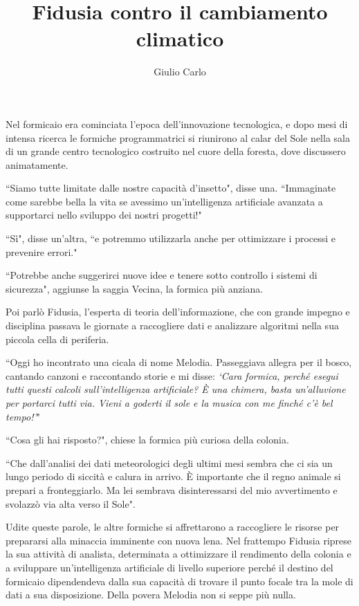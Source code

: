 \documentclass[12pt,b5paper]{article}
\author{Giulio Carlo}
\date{}
\title{Fidusia contro il cambiamento climatico}
\begin{document}
\maketitle
{}
Nel formicaio era cominciata l'epoca dell'innovazione tecnologica, e dopo mesi
di intensa ricerca le formiche programmatrici si riunirono al calar del Sole
nella sala di un grande centro tecnologico costruito nel cuore della foresta,
dove discussero animatamente.

``Siamo tutte limitate dalle nostre capacità d'insetto", disse una. ``Immaginate
come sarebbe bella la vita se avessimo un'intelligenza artificiale avanzata a
supportarci nello sviluppo dei nostri progetti!"

``Sì", disse un'altra, ``e potremmo utilizzarla anche per ottimizzare i processi
e prevenire errori."

``Potrebbe anche suggerirci nuove idee e tenere sotto controllo i sistemi di
sicurezza", aggiunse la saggia Vecina, la formica più anziana.

Poi parlò Fidusia, l'esperta di teoria dell'informazione, che con grande
impegno e disciplina passava le giornate a raccogliere dati e analizzare
algoritmi nella sua piccola cella di periferia.

``Oggi ho incontrato una cicala di nome Melodia. Passeggiava allegra
per il bosco, cantando canzoni e raccontando storie e mi disse:
\emph{`Cara formica, perché esegui tutti questi calcoli sull'intelligenza
artificiale? È una chimera, basta un'alluvione per portarci tutti via. Vieni
a goderti il sole e la musica con me finché c'è bel tempo!'}"

``Cosa gli hai risposto?", chiese la formica più curiosa della colonia.

``Che dall'analisi dei dati meteorologici degli ultimi mesi sembra che ci sia
un lungo periodo di siccità e calura in arrivo. È importante che il regno
animale si prepari a fronteggiarlo. Ma lei sembrava disinteressarsi del mio
avvertimento e svolazzò via alta verso il Sole".

Udite queste parole, le altre formiche si affrettarono a raccogliere le risorse
per prepararsi alla minaccia imminente con nuova lena. Nel frattempo Fidusia
riprese la sua attività di analista, determinata a ottimizzare il rendimento
della colonia e a sviluppare un'intelligenza artificiale di livello superiore
perché il destino del formicaio dipendendeva dalla sua capacità di trovare il
punto focale tra la mole di dati a sua disposizione. Della povera Melodia non
si seppe più nulla.
\newpage
\end{document}
